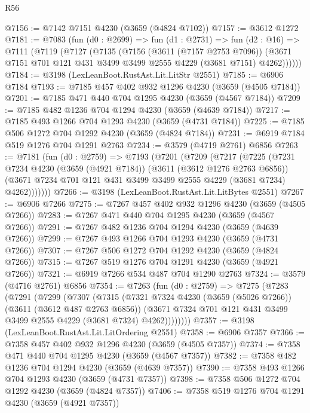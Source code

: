 \begin{lexlean}{R56}
\begin{coremodule}
@7156 := @7142 @7151 @4230 (@3659 (@4824 @7102))
@7157 := @3612 @1272
@7181 := @7083
    (fun (d0 : @2699) =>
    fun (d1 : @2731) =>
    fun (d2 : @16) =>
    @7111
      (@7119
        (@7127
          (@7135
            (@7156
              (@3611 (@7157 @2753 @7096))
              (@3671 @7151 @701 @121 @431 @3499 @3499 @2555 @4229 (@3681 @7151) @4262))))))
@7184 := @3198 (LexLeanBoot.RustAst.Lit.LitStr @2551)
@7185 := @6906 @7184
@7193 := @7185 @457 @402 @932 @1296 @4230 (@3659 (@4505 @7184))
@7201 := @7185 @471 @440 @704 @1295 @4230 (@3659 (@4567 @7184))
@7209 := @7185 @482 @1236 @704 @1294 @4230 (@3659 (@4639 @7184))
@7217 := @7185 @493 @1266 @704 @1293 @4230 (@3659 (@4731 @7184))
@7225 := @7185 @506 @1272 @704 @1292 @4230 (@3659 (@4824 @7184))
@7231 := @6919 @7184 @519 @1276 @704 @1291 @2763
@7234 := @3579 (@4719 @2761) @6856
@7263 := @7181
    (fun (d0 : @2759) =>
    @7193
      (@7201
        (@7209
          (@7217
            (@7225
              (@7231
                @7234
                @4230
                (@3659 (@4921 @7184))
                (@3611 (@3612 @1276 @2763 @6856))
                (@3671 @7234 @701 @121 @431 @3499 @3499 @2555 @4229 (@3681 @7234) @4262)))))))
@7266 := @3198 (LexLeanBoot.RustAst.Lit.LitBytes @2551)
@7267 := @6906 @7266
@7275 := @7267 @457 @402 @932 @1296 @4230 (@3659 (@4505 @7266))
@7283 := @7267 @471 @440 @704 @1295 @4230 (@3659 (@4567 @7266))
@7291 := @7267 @482 @1236 @704 @1294 @4230 (@3659 (@4639 @7266))
@7299 := @7267 @493 @1266 @704 @1293 @4230 (@3659 (@4731 @7266))
@7307 := @7267 @506 @1272 @704 @1292 @4230 (@3659 (@4824 @7266))
@7315 := @7267 @519 @1276 @704 @1291 @4230 (@3659 (@4921 @7266))
@7321 := @6919 @7266 @534 @487 @704 @1290 @2763
@7324 := @3579 (@4716 @2761) @6856
@7354 := @7263
    (fun (d0 : @2759) =>
    @7275
      (@7283
        (@7291
          (@7299
            (@7307
              (@7315
                (@7321
                  @7324
                  @4230
                  (@3659 (@5026 @7266))
                  (@3611 (@3612 @487 @2763 @6856))
                  (@3671 @7324 @701 @121 @431 @3499 @3499 @2555 @4229 (@3681 @7324) @4262))))))))
@7357 := @3198 (LexLeanBoot.RustAst.Lit.LitOrdering @2551)
@7358 := @6906 @7357
@7366 := @7358 @457 @402 @932 @1296 @4230 (@3659 (@4505 @7357))
@7374 := @7358 @471 @440 @704 @1295 @4230 (@3659 (@4567 @7357))
@7382 := @7358 @482 @1236 @704 @1294 @4230 (@3659 (@4639 @7357))
@7390 := @7358 @493 @1266 @704 @1293 @4230 (@3659 (@4731 @7357))
@7398 := @7358 @506 @1272 @704 @1292 @4230 (@3659 (@4824 @7357))
@7406 := @7358 @519 @1276 @704 @1291 @4230 (@3659 (@4921 @7357))

\end{coremodule}
\end{lexlean}
